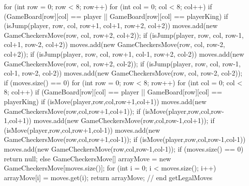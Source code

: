 \documentclass[10pt, a4paper]{article}
\begin{document}
{{         for (int row = 0; row < 8; row++) {
            for (int col = 0; col < 8; col++) {
               if (GameBoard[row][col] == player || GameBoard[row][col] == playerKing) {
                  if (isJump(player, row, col, row+1, col+1, row+2, col+2))
                     moves.add(new GameCheckersMove(row, col, row+2, col+2));
                  if (isJump(player, row, col, row-1, col+1, row-2, col+2))
                     moves.add(new GameCheckersMove(row, col, row-2, col+2));
                  if (isJump(player, row, col, row+1, col-1, row+2, col-2))
                     moves.add(new GameCheckersMove(row, col, row+2, col-2));
                  if (isJump(player, row, col, row-1, col-1, row-2, col-2))
                     moves.add(new GameCheckersMove(row, col, row-2, col-2));
               }
            }
         }
         if (moves.size() == 0) {
            for (int row = 0; row < 8; row++) {
               for (int col = 0; col < 8; col++) {
                  if (GameBoard[row][col] == player || GameBoard[row][col] == playerKing) {
                     if (isMove(player,row,col,row+1,col+1))
                        moves.add(new GameCheckersMove(row,col,row+1,col+1));
                     if (isMove(player,row,col,row-1,col+1))
                        moves.add(new GameCheckersMove(row,col,row-1,col+1));
                     if (isMove(player,row,col,row+1,col-1))
                        moves.add(new GameCheckersMove(row,col,row+1,col-1));
                     if (isMove(player,row,col,row-1,col-1))
                        moves.add(new GameCheckersMove(row,col,row-1,col-1));
                  }
               }
            }
         }
         if (moves.size() == 0)
            return null;
         else {
            GameCheckersMove[] arrayMove = new GameCheckersMove[moves.size()];
            for (int i = 0; i < moves.size(); i++)
               arrayMove[i] = moves.get(i);
            return arrayMove;
         }
      }  // end getLegalMoves

}
\end{document}
